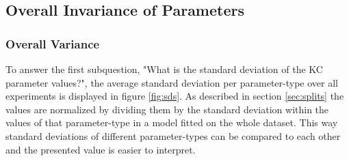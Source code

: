 \documentclass{scrartcl}
\begin{document}
\subsection{Overall Invariance of Parameters}
\label{sec:varresults}
\subsubsection{Overall Variance}
To answer the first subquestion, "What is the standard deviation of the KC parameter values?", the average standard deviation per parameter-type over all experiments is displayed in figure \ref{fig:sds}. As described in section \ref{sec:splits} the values are normalized by dividing them by the standard deviation within the values of that parameter-type in a model fitted on the whole dataset. This way standard deviations of different parameter-types can be compared to each other and the presented value is easier to interpret. 
\end{document}
